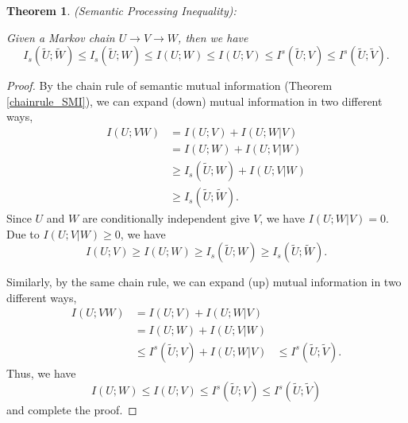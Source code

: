 \documentclass[12pt, draftclsnofoot,onecolumn]{IEEEtran}
\newtheorem{theorem}{\bf{Theorem}}
\begin{document}
\begin{theorem}
(\textit{Semantic Processing Inequality}):

Given a Markov chain $U\to V \to W$, then we have
\begin{equation}
I_s(\tilde{U};\tilde{W})\leq I_s(\tilde{U};W)\leq I(U;W)\leq I(U;V) \leq I^s(\tilde{U};V) \leq I^s(\tilde{U};\tilde{V}).
\end{equation}
\end{theorem}
\begin{proof}
By the chain rule of semantic mutual information (Theorem \ref{chainrule_SMI}), we can expand (down) mutual information in two different ways,
\begin{equation}
\begin{aligned}
I(U;VW)&=I(U;V)+I(U;W|V)\\
             &=I(U;W)+I(U;V|W)\\
             &\geq I_s(\tilde{U};W)+I(U;V|W)\\
             &\geq I_s(\tilde{U};\tilde{W}).
\end{aligned}
\end{equation}
Since $U$ and $W$ are conditionally independent give $V$, we have $I(U;W|V)=0$. Due to $I(U;V|W)\geq 0$, we have
\begin{equation}
I(U;V)\geq I(U;W) \geq I_s(\tilde{U};W) \geq I_s(\tilde{U};\tilde{W}).
\end{equation}

Similarly, by the same chain rule, we can expand (up) mutual information in two different ways,
\begin{equation}
\begin{aligned}
I(U;VW)&=I(U;V)+I(U;W|V)\\
             &=I(U;W)+I(U;V|W)\\
             &\leq I^s(\tilde{U};V)+I(U;W|V)
             &\leq I^s(\tilde{U};\tilde{V}).
\end{aligned}
\end{equation}
Thus, we have
\begin{equation}
I(U;W) \leq I(U;V)\leq I^s(\tilde{U};V) \leq I^s(\tilde{U};\tilde{V})
\end{equation}
and complete the proof.
\end{proof}
\end{document}
